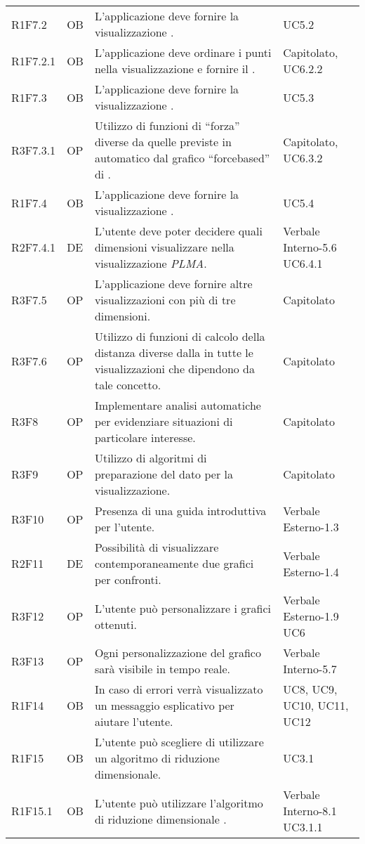 {\begin{longtable}{C{2cm} | C{1.5cm} | C{9cm} | C{3.3cm}}
R1F7.2 & OB & L'applicazione deve fornire la visualizzazione . & UC5.2\\
R1F7.2.1 & OB & L'applicazione deve ordinare i punti nella visualizzazione  e fornire il . & Capitolato, UC6.2.2 \\
R1F7.3 & OB & L'applicazione deve fornire la visualizzazione . & UC5.3\\
R3F7.3.1 & OP & Utilizzo di funzioni di “forza” diverse da quelle previste in automatico dal grafico “forcebased” di . & Capitolato, UC6.3.2\\
R1F7.4 & OB & L'applicazione deve fornire la visualizzazione . & UC5.4 \\
R2F7.4.1 & DE & L'utente deve poter decidere quali dimensioni visualizzare nella visualizzazione \textit{PLMA}. & Verbale Interno-5.6 \newline UC6.4.1\\
R3F7.5 & OP & L'applicazione deve fornire altre visualizzazioni con più di tre dimensioni. & Capitolato\\
R3F7.6 & OP & Utilizzo di funzioni di calcolo della distanza diverse dalla  in tutte le visualizzazioni che dipendono da tale concetto. & Capitolato \\
R3F8 & OP & Implementare analisi automatiche per evidenziare situazioni di particolare interesse. & Capitolato\\
R3F9 & OP & Utilizzo di algoritmi di preparazione del dato per la visualizzazione. & Capitolato\\
R3F10 & OP & Presenza di una guida introduttiva per l'utente. & Verbale Esterno-1.3\\
R2F11 & DE & Possibilità di visualizzare contemporaneamente due grafici per confronti. & Verbale Esterno-1.4\\
R3F12 & OP & L'utente può personalizzare i grafici ottenuti. & Verbale Esterno-1.9 \newline UC6 \\
R3F13 & OP & Ogni personalizzazione del grafico sarà visibile in tempo reale. & Verbale Interno-5.7 \\
R1F14 & OB & In caso di errori verrà visualizzato un messaggio esplicativo per aiutare l'utente. & UC8, UC9, UC10, UC11, UC12\\
R1F15 & OB & L'utente può scegliere di utilizzare un algoritmo di riduzione dimensionale. & UC3.1 \\
R1F15.1 & OB & L'utente può utilizzare l'algoritmo di riduzione dimensionale . & Verbale Interno-8.1 \newline UC3.1.1 \\

\end{longtable}}
